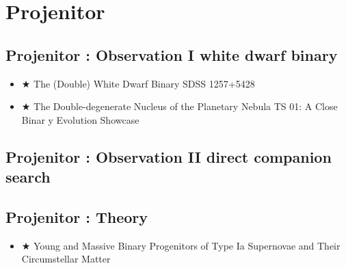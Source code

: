 \section{Projenitor}
\subsection{Projenitor : Observation I white dwarf binary}
\begin{itemize}
\item $\bigstar$ The (Double) White Dwarf Binary SDSS 1257+5428 \citep{kulkarni10a}
\item $\bigstar$ The Double-degenerate Nucleus of the Planetary Nebula TS 01: A Close Binar
y Evolution Showcase \citep{tovmassian10a}
\end{itemize}
\subsection{Projenitor : Observation II direct companion search}
\subsection{Projenitor : Theory}
\begin{itemize}
\item $\bigstar$ Young and Massive Binary Progenitors of Type Ia Supernovae and Their Circumstellar Matter
\end{itemize}
